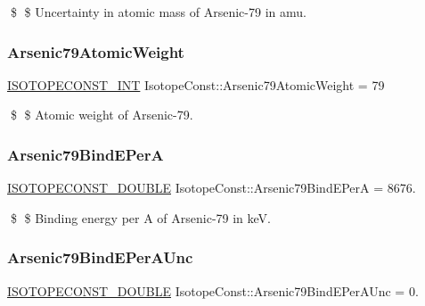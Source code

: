 \$ \$ Uncertainty in atomic mass of Arsenic-\/79 in amu. \mbox{\label{group___isotope_const-_arsenic-_as79_ga52ae93dbfa843faf5442cb99bb6d963c}} 
\subsubsection{\texorpdfstring{Arsenic79\+Atomic\+Weight}{Arsenic79AtomicWeight}}
{\footnotesize\ttfamily \mbox{\hyperlink{group___isotope_const-_macros_ga5f18360b3e99483a35c32d789e62621c}{I\+S\+O\+T\+O\+P\+E\+C\+O\+N\+S\+T\+\_\+\+I\+NT}} Isotope\+Const\+::\+Arsenic79\+Atomic\+Weight = 79}

\$ \$ Atomic weight of Arsenic-\/79. \mbox{\label{group___isotope_const-_arsenic-_as79_ga19787190a6a057f4a1b30523f06e32d7}} 
\subsubsection{\texorpdfstring{Arsenic79\+Bind\+E\+PerA}{Arsenic79BindEPerA}}
{\footnotesize\ttfamily \mbox{\hyperlink{group___isotope_const-_macros_ga8f45a7272ce02c0b4c65c44636ed719a}{I\+S\+O\+T\+O\+P\+E\+C\+O\+N\+S\+T\+\_\+\+D\+O\+U\+B\+LE}} Isotope\+Const\+::\+Arsenic79\+Bind\+E\+PerA = 8676.}

\$ \$ Binding energy per A of Arsenic-\/79 in keV. \mbox{\label{group___isotope_const-_arsenic-_as79_gaf7369de6af843133832773005d2eeb57}} 
\subsubsection{\texorpdfstring{Arsenic79\+Bind\+E\+Per\+A\+Unc}{Arsenic79BindEPerAUnc}}
{\footnotesize\ttfamily \mbox{\hyperlink{group___isotope_const-_macros_ga8f45a7272ce02c0b4c65c44636ed719a}{I\+S\+O\+T\+O\+P\+E\+C\+O\+N\+S\+T\+\_\+\+D\+O\+U\+B\+LE}} Isotope\+Const\+::\+Arsenic79\+Bind\+E\+Per\+A\+Unc = 0.}

